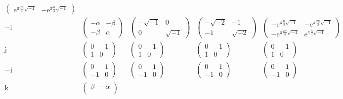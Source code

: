 \documentclass[
]{book}
\theoremstyle{definition}
\theoremstyle{definition}
\theoremstyle{definition}
\theoremstyle{definition}
\theoremstyle{remark}
\begin{document}
\[\begin{array}{ccccc}
\begin{pmatrix}
\mathrm{e}^{\pi\frac{2n}{3}\sqrt{-1}} & -\mathrm{e}^{\pi\frac{n}{3}\sqrt{-1}}
\end{pmatrix}\\
-\mathrm{i} & \begin{pmatrix}-\alpha & -\beta\\
-\beta & \alpha
\end{pmatrix} & \begin{pmatrix}-\sqrt{-1} & 0\\
0 & \sqrt{-1}
\end{pmatrix} & \begin{pmatrix}-\sqrt{-2} & -1\\
-1 & \sqrt{-2}
\end{pmatrix} & \begin{pmatrix}-\mathrm{e}^{\pi\frac{n}{3}\sqrt{-1}} & -\mathrm{e}^{\pi\frac{2n}{3}\sqrt{-1}}\\
-\mathrm{e}^{\pi\frac{2n}{3}\sqrt{-1}} & \mathrm{e}^{\pi\frac{n}{3}\sqrt{-1}}
\end{pmatrix}\\
\mathrm{j} & \begin{pmatrix}0 & -1\\
1 & 0
\end{pmatrix} & \begin{pmatrix}0 & -1\\
1 & 0
\end{pmatrix} & \begin{pmatrix}0 & -1\\
1 & 0
\end{pmatrix} & \begin{pmatrix}0 & -1\\
1 & 0
\end{pmatrix}\\
-\mathrm{j} & \begin{pmatrix}0 & 1\\
-1 & 0
\end{pmatrix} & \begin{pmatrix}0 & 1\\
-1 & 0
\end{pmatrix} & \begin{pmatrix}0 & 1\\
-1 & 0
\end{pmatrix} & \begin{pmatrix}0 & 1\\
-1 & 0
\end{pmatrix}\\
\mathrm{k} & \begin{pmatrix}\beta & -\alpha\\

\end{pmatrix}
\end{array}\]
\end{document}
